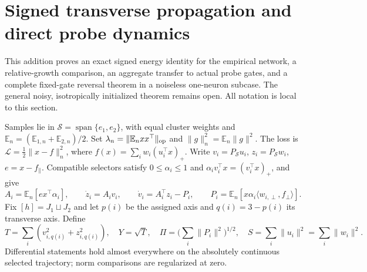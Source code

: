 \documentclass{article} %
\theoremstyle{plain}
\theoremstyle{definition}
\theoremstyle{remark}
\begin{document}
\section{Signed transverse propagation and direct probe dynamics}
\label{sbsign:scope}
This addition proves an exact signed energy identity for the empirical
network, a relative-growth comparison, an aggregate transfer to actual
probe gates, and a complete fixed-gate reversal theorem in a noiseless
one-neuron subcase. The general noisy, isotropically initialized theorem
remains open. All notation is local to this section.

Samples lie in $\mathcal S=\operatorname{span}\{e_1,e_2\}$, with equal
cluster weights and $\mathbb E_n=(\mathbb E_{1,n}+\mathbb E_{2,n})/2$.
Set $\lambda_n=\|\mathbb E_nxx^\top\|_{\rm op}$ and
$\|g\|_n^2=\mathbb E_n\|g\|^2$. The loss is
$\mathcal L=\frac12\|x-f\|_n^2$, where
$f(x)=\sum_iw_i(u_i^\top x)_+$.
Write $v_i=P_{\mathcal S}u_i$, $z_i=P_{\mathcal S}w_i$, $e=x-f_\parallel$.
Compatible selectors satisfy $0\le\alpha_i\le1$ and
$\alpha_i v_i^\top x=(v_i^\top x)_+$, and give
\[
 A_i=\mathbb E_n[e x^\top\alpha_i],\qquad
 \dot z_i=A_iv_i,\qquad \dot v_i=A_i^\top z_i-P_i,
 \qquad
 P_i=\mathbb E_n[x\alpha_i\langle w_{i,\perp},f_\perp\rangle].
\]
Fix $[h]=J_1\sqcup J_2$ and let $p(i)$ be the assigned axis and
$q(i)=3-p(i)$ its transverse axis. Define
\[
 T=\sum_i(v_{i,q(i)}^2+z_{i,q(i)}^2),\quad Y=\sqrt T,\quad
 \Pi=\Big(\sum_i\|P_i\|^2\Big)^{1/2},\quad
 S=\sum_i\|u_i\|^2=\sum_i\|w_i\|^2.
\]
Differential statements hold almost everywhere on the absolutely
continuous selected trajectory; norm comparisons are regularized at zero.
\end{document}

